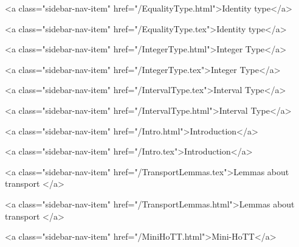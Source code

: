       
        
          <a class="sidebar-nav-item" href="/EqualityType.html">Identity type</a>
        
      
    
      
        
          <a class="sidebar-nav-item" href="/EqualityType.tex">Identity type</a>
        
      
    
      
        
          <a class="sidebar-nav-item" href="/IntegerType.html">Integer Type</a>
        
      
    
      
        
          <a class="sidebar-nav-item" href="/IntegerType.tex">Integer Type</a>
        
      
    
      
        
          <a class="sidebar-nav-item" href="/IntervalType.tex">Interval Type</a>
        
      
    
      
        
          <a class="sidebar-nav-item" href="/IntervalType.html">Interval Type</a>
        
      
    
      
        
          <a class="sidebar-nav-item" href="/Intro.html">Introduction</a>
        
      
    
      
        
          <a class="sidebar-nav-item" href="/Intro.tex">Introduction</a>
        
      
    
      
        
          <a class="sidebar-nav-item" href="/TransportLemmas.tex">Lemmas about transport </a>
        
      
    
      
        
          <a class="sidebar-nav-item" href="/TransportLemmas.html">Lemmas about transport </a>
        
      
    
      
        
          <a class="sidebar-nav-item" href="/MiniHoTT.html">Mini-HoTT</a>
        
      
    
